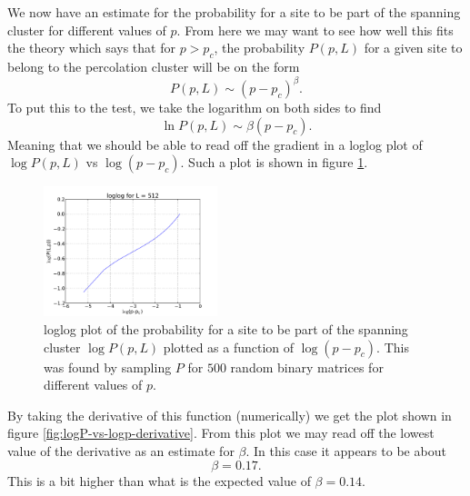 \documentclass[a4paper,reprint,floatfix,amsmath,amssymb,aps,pra]{revtex4-1}
\begin{document}
We now have an estimate for the probability for a site to be part of the spanning cluster for different values of $p$. From here we may want to see how well this fits the theory which says that for $p > p_{c}$, the probability $P(p,L)$ for a given site to belong to the percolation cluster will be on the form
\begin{equation}
  P(p,L) \sim (p-p_{c})^{\beta}.
\end{equation} 
To put this to the test, we take the logarithm on both sides to find
\begin{equation}
  \ln P(p,L) \sim \beta (p-p_{c}).
\end{equation} 
Meaning that we should be able to read off the gradient in a loglog plot of $\log P(p,L)$ vs $\log(p-p_{c})$. Such a plot is shown in figure \ref{fig:logP-vs-logp}.
\begin{figure}
  \centering
  \includegraphics[width=0.45\textwidth]{../percolation/results/1a/P-vs-p-L512-nsamples500-loglog.pdf}
  \caption{loglog plot of the probability for a site to be part of the spanning cluster $\log P(p,L)$ plotted as a function of $\log (p-p_{c})$. This was found by sampling $P$ for $500$ random binary matrices for different values of $p$.}
  \label{fig:logP-vs-logp}
\end{figure}
By taking the derivative of this function (numerically) we get the plot shown in figure \ref{fig:logP-vs-logp-derivative}. From this plot we may read off the lowest value of the derivative as an estimate for $\beta$. In this case it appears to be about 
\begin{equation}
\beta = 0.17.             
\end{equation} 
This is a bit higher than what is the expected value of $\beta = 0.14$.
\end{document}
